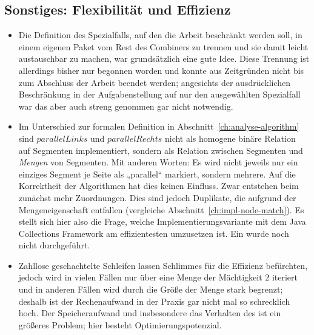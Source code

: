 \documentclass[../main/thesis.tex]{subfiles}
\begin{document}
\subsection{Sonstiges: Flexibilität und Effizienz}

\begin{itemize}

\item
Die Definition des Spezialfalls, auf den die Arbeit beschränkt werden soll, in einem eigenen Paket  vom Rest des Combiners zu trennen und sie damit leicht austauschbar zu machen, war grundsätzlich eine gute Idee.
Diese Trennung ist allerdings bisher nur begonnen worden und konnte aus Zeitgründen nicht bis zum Abschluss der Arbeit beendet werden; angesichts der ausdrücklichen Beschränkung in der Aufgabenstellung auf nur den ausgewählten Spezialfall war das aber auch streng genommen gar nicht notwendig.

\item
Im Unterschied zur formalen Definition in Abschnitt~\ref{ch:analyse-algorithm} sind $parallelLinks$ und $parallelRechts$ nicht als homogene binäre Relation auf Segmenten implementiert, sondern als Relation zwischen Segmenten und \emph{Mengen} von Segmenten.
Mit anderen Worten: Es wird nicht jeweils nur ein einziges Segment je Seite als „parallel“ markiert, sondern mehrere.
Auf die Korrektheit der Algorithmen hat dies keinen Einfluss.
Zwar entstehen beim  zunächst mehr Zuordnungen.
Dies sind jedoch Duplikate, die aufgrund der Mengeneigenschaft entfallen (vergleiche Abschnitt~\ref{ch:impl-node-match}).
Es stellt sich hier also die Frage, welche Implementierungsvariante mit dem Java Collections Framework am effizientesten umzusetzen ist.
Ein  wurde noch nicht durchgeführt.

\item
Zahllose geschachtelte Schleifen lassen Schlimmes für die Effizienz befürchten, jedoch wird in vielen Fällen nur über eine Menge der Mächtigkeit $2$ iteriert
und in anderen Fällen wird durch  die Größe der Menge stark begrenzt; deshalb ist der Rechenaufwand in der Praxis gar nicht mal so schrecklich hoch.
Der Speicheraufwand und insbesondere das Verhalten des  ist ein größeres Problem; hier besteht Optimierungspotenzial.

\end{itemize}



\onlyinsubfile{\listoffigures}
\onlyinsubfile{}
\end{document}
